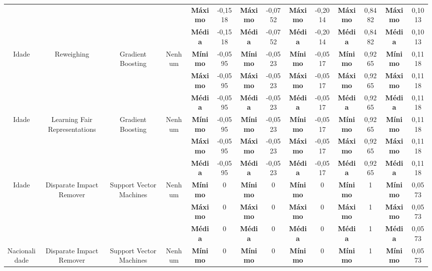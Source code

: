 \documentclass[Portugues,Final]{ic-tese-v3}
\begin{document}
\begin{table}[H]
\begin{center}
{\begin{tabular}{c|c|c|c|c|c|c|c|c|c|c|c|c|c}
             & & & & \textbf{Máximo} & -0,1518 & \textbf{Máximo} & -0,0752 & \textbf{Máximo} & -0,2014 & \textbf{Máximo} & 0,8482 & \textbf{Máximo} & 0,1013 \\
             & & & & \textbf{Média} & -0,1518 & \textbf{Média} & -0,0752 & \textbf{Média} & -0,2014 & \textbf{Média} & 0,8482 & \textbf{Média} & 0,1013 \\
            \hline
            \multirow{3}{*}{Idade} & \multirow{3}{*}{Reweighing} & \multirow{3}{*}{Gradient Boosting} & \multirow{3}{*}{Nenhum} & \textbf{Mínimo} & -0,0595 & \textbf{Mínimo} & -0,0523 & \textbf{Mínimo} & -0,0517 & \textbf{Mínimo} & 0,9265 & \textbf{Mínimo} & 0,1118 \\
             & & & & \textbf{Máximo} & -0,0595 & \textbf{Máximo} & -0,0523 & \textbf{Máximo} & -0,0517 & \textbf{Máximo} & 0,9265 & \textbf{Máximo} & 0,1118 \\
             & & & & \textbf{Média} & -0,0595 & \textbf{Média} & -0,0523 & \textbf{Média} & -0,0517 & \textbf{Média} & 0,9265 & \textbf{Média} & 0,1118 \\
            \hline
            \multirow{3}{*}{Idade} & \multirow{3}{*}{Learning Fair Representations} & \multirow{3}{*}{Gradient Boosting} & \multirow{3}{*}{Nenhum} & \textbf{Mínimo} & -0,0595 & \textbf{Mínimo} & -0,0523 & \textbf{Mínimo} & -0,0517 & \textbf{Mínimo} & 0,9265 & \textbf{Mínimo} & 0,1118 \\
             & & & & \textbf{Máximo} & -0,0595 & \textbf{Máximo} & -0,0523 & \textbf{Máximo} & -0,0517 & \textbf{Máximo} & 0,9265 & \textbf{Máximo} & 0,1118 \\
             & & & & \textbf{Média} & -0,0595 & \textbf{Média} & -0,0523 & \textbf{Média} & -0,0517 & \textbf{Média} & 0,9265 & \textbf{Média} & 0,1118 \\
            \hline
            \multirow{3}{*}{Idade} & \multirow{3}{*}{Disparate Impact Remover} & \multirow{3}{*}{Support Vector Machines} & \multirow{3}{*}{Nenhum} & \textbf{Mínimo} & 0 & \textbf{Mínimo} & 0 & \textbf{Mínimo} & 0 & \textbf{Mínimo} & 1 & \textbf{Mínimo} & 0,0573 \\
             & & & & \textbf{Máximo} & 0 & \textbf{Máximo} & 0 & \textbf{Máximo} & 0 & \textbf{Máximo} & 1 & \textbf{Máximo} & 0,0573 \\
             & & & & \textbf{Média} & 0 & \textbf{Média} & 0 & \textbf{Média} & 0 & \textbf{Média} & 1 & \textbf{Média} & 0,0573 \\
            \hline
            \multirow{3}{*}{Nacionalidade} & \multirow{3}{*}{Disparate Impact Remover} & \multirow{3}{*}{Support Vector Machines} & \multirow{3}{*}{Nenhum} & \textbf{Mínimo} & 0 & \textbf{Mínimo} & 0 & \textbf{Mínimo} & 0 & \textbf{Mínimo} & 1 & \textbf{Mínimo} & 0,0573 \\

\end{tabular}}
\end{center}
\end{table}
\end{document}
